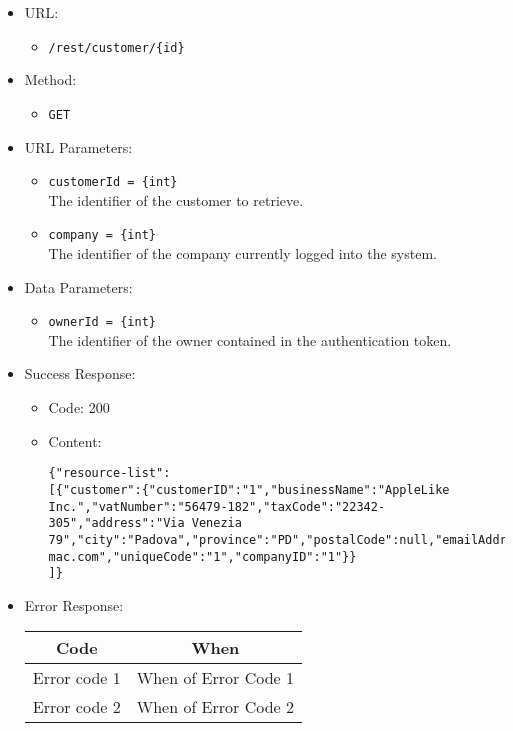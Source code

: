 \begin{itemize}
    
    \item URL: 
    \begin{itemize}
        \item \texttt{/rest/customer/\{id\}}
    \end{itemize}
    
    \item Method: 
    \begin{itemize}
        \item \texttt{GET}
    \end{itemize}
    
    \item URL Parameters: 
    \begin{itemize}
        \item \texttt{customerId = \{int\}} \\
        The identifier of the customer to retrieve.
        \item \texttt{company = \{int\}} \\
        The identifier of the company currently logged into the system.   
    \end{itemize}
    
    \item Data Parameters: 
    \begin{itemize}
        \item \texttt{ownerId = \{int\}} \\
        The identifier of the owner contained in the authentication token.
    \end{itemize}
    
    \item Success Response: 
    \begin{itemize}
        \item Code: 200
        \item Content:
        \begin{lstlisting}
{"resource-list":
[{"customer":{"customerID":"1","businessName":"AppleLike Inc.","vatNumber":"56479-182","taxCode":"22342-305","address":"Via Venezia 79","city":"Padova","province":"PD","postalCode":null,"emailAddress":"applelike@google.com","pec":"applelike@pec-mac.com","uniqueCode":"1","companyID":"1"}}
]}
        \end{lstlisting}        
    \end{itemize}
    
    \item Error Response:
    \begin{table}[!h]
    \centering 
    \begin{tabular}{|c|c|}
    \hline
    \multicolumn{1}{|c|}{\textbf{Code}} & \multicolumn{1}{c|}{\textbf{When}} \\ \hline
    Error code 1 & When of Error Code 1 \\\hline
    Error code 2 & When of Error Code 2 \\\hline
    \end{tabular} 
    \end{table} 
    
\end{itemize}


